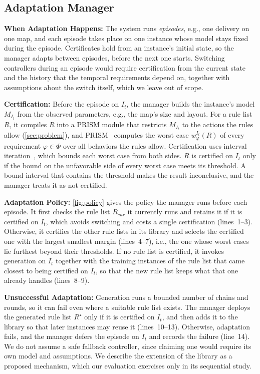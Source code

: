 \subsection{Adaptation Manager}
\label{sec:manager}
\label{sec:certification}

\textbf{When Adaptation Happens:}
The system runs \textit{episodes}, e.g., one delivery on one map, and each episode takes place on one instance whose model stays fixed during the episode.
Certificates hold from an instance's initial state, so the manager adapts between episodes, before the next one starts.
Switching controllers during an episode would require certification from the current state and the history that the temporal requirements depend on, together with assumptions about the switch itself, which we leave out of scope.

\textbf{Certification:}
Before the episode on $I_t$, the manager builds the instance's model $M_{I_t}$ from the observed parameters, e.g., the map's size and layout.
For a rule list $R$, it compiles $R$ into a PRISM module that restricts $M_{I_t}$ to the actions the rules allow (\autoref{sec:problem}), and PRISM~\cite{TODO-PRISM} computes the worst case $w_\varphi^{I_t}(R)$ of every requirement $\varphi \in \Phi$ over all behaviors the rules allow.
Certification uses interval iteration~\cite{TODO-Haddad2018-interval-iteration}, which bounds each worst case from both sides.
$R$ is certified on $I_t$ only if the bound on the unfavorable side of every worst case meets its threshold.
A bound interval that contains the threshold makes the result inconclusive, and the manager treats it as not certified.

\textbf{Adaptation Policy:}
\autoref{fig:policy} gives the policy the manager runs before each episode.
It first checks the rule list $R_{\mathit{cur}}$ it currently runs and retains it if it is certified on $I_t$, which avoids switching and costs a single certification (lines~1--3).
Otherwise, it certifies the other rule lists in its library and selects the certified one with the largest smallest margin (lines~4--7), i.e., the one whose worst cases lie furthest beyond their thresholds.
If no rule list is certified, it invokes generation on $I_t$ together with the training instances of the rule list that came closest to being certified on $I_t$, so that the new rule list keeps what that one already handles (lines~8--9).

\textbf{Unsuccessful Adaptation:}
Generation runs a bounded number of chains and rounds, so it can fail even where a suitable rule list exists.
The manager deploys the generated rule list $R^\star$ only if it is certified on $I_t$, and then adds it to the library so that later instances may reuse it (lines~10--13).
Otherwise, adaptation fails, and the manager defers the episode on $I_t$ and records the failure (line~14).
We do not assume a safe fallback controller, since claiming one would require its own model and assumptions.
We describe the extension of the library as a proposed mechanism, which our evaluation exercises only in its sequential study.

